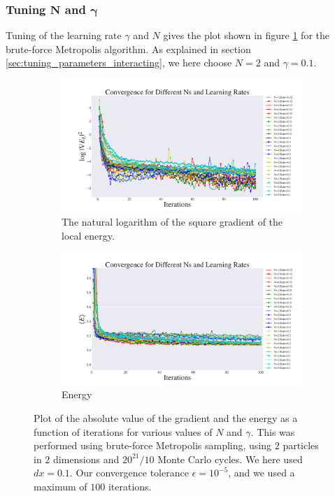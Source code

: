\documentclass[a4paper, 10pt]{article}
\begin{document}
\subsubsection{Tuning $\boldsymbol{N}$ and $\boldsymbol{\gamma}$}
Tuning of the learning rate $\gamma$ and $N$ gives the plot shown in figure \ref{fig:step_size_and_N_interacting} for the brute-force Metropolis algorithm. As explained in section \ref{sec:tuning_parameters_interacting}, we here choose $N=2$ and $\gamma=0.1$.\\
\begin{figure}[ht!]
		\begin{subfigure}[t]{.9\textwidth}
			\centering
			\includegraphics[width=\textwidth]{../Results/grad_normal_interacting.pdf}
			\caption{The natural logarithm of the square gradient of the local energy.}
		\end{subfigure}%
		
		\begin{subfigure}[b]{.9\textwidth}
			\centering
			\includegraphics[width=\textwidth]{../Results/energy_normal_interacting.pdf}
			\caption{Energy}
		\end{subfigure}%
	\caption{Plot of the absolute value of the gradient and the energy as a function of iterations for various values of $N$ and $\gamma$. This was performed using brute-force Metropolis sampling, using $2$ particles in $2$ dimensions and $20^{21}/10$ Monte Carlo cycles. We here used $dx=0.1$. Our convergence tolerance $\epsilon = 10^{-5}$, and we used a maximum of $100$ iterations.}\label{fig:step_size_and_N_interacting}
\end{figure}\\
\end{document}
